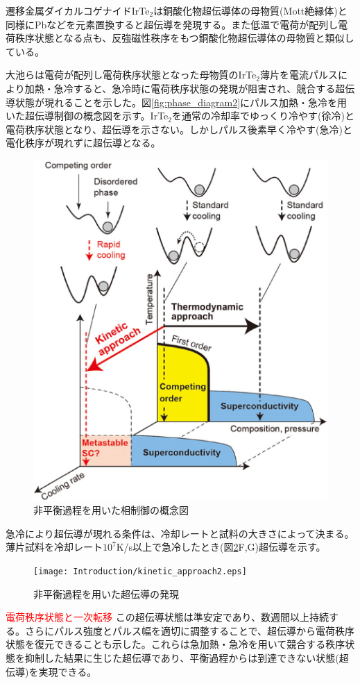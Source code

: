 遷移金属ダイカルコゲナイドIrTe$_2$は銅酸化物超伝導体の母物質(Mott絶縁体)と同様にPbなどを元素置換すると超伝導を発現する\cite{IrTe2Pd_SC}。また低温で電荷が配列し電荷秩序状態となる点も、反強磁性秩序をもつ銅酸化物超伝導体の母物質と類似している。

大池らは電荷が配列し電荷秩序状態となった母物質のIrTe$_2$薄片を電流パルスにより加熱・急冷すると、急冷時に電荷秩序状態の発現が阻害され、競合する超伝導状態が現れることを示した\cite{oike}。図\ref{fig:phase_diagram2}にパルス加熱・急冷を用いた超伝導制御の概念図を示す。IrTe$_2$を通常の冷却率でゆっくり冷やす(徐冷)と電荷秩序状態となり、超伝導を示さない。しかしパルス後素早く冷やす(急冷)と電化秩序が現れずに超伝導となる。
\begin{figure}[!h]
    \begin{center}
   \includegraphics[width=0.6\hsize]{Introduction/kinetic_approach.eps}
  \end{center}
  \caption{非平衡過程を用いた相制御の概念図}
  \label{fig:kinetic_approach}
\end{figure}

急冷により超伝導が現れる条件は、冷却レートと試料の大きさによって決まる\cite{oike,Oike_size}。薄片試料を冷却レート$10^7$K/s以上で急冷したとき(図\ref{fig:kinetic_approach2}F,G)超伝導を示す。
\begin{figure}[!h]
    \begin{center}
   \texttt{[image: Introduction/kinetic\_approach2.eps]}
  \end{center}
  \caption{非平衡過程を用いた超伝導の発現}
  \label{fig:kinetic_approach2}
\end{figure}


\textcolor{red}{電荷秩序状態と一次転移}
この超伝導状態は準安定であり、数週間以上持続する。さらにパルス強度とパルス幅を適切に調整することで、超伝導から電荷秩序状態を復元できることも示した。これらは急加熱・急冷を用いて競合する秩序状態を抑制した結果に生じた超伝導であり、平衡過程からは到達できない状態(超伝導)を実現できる。

